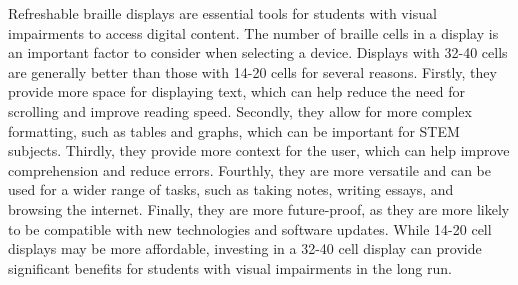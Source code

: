 \documentclass[14pt,letterpaper,twoside]{extreport}
\begin{document}
Refreshable braille displays are essential tools for students with visual impairments to access digital content. The number of braille cells in a display is an important factor to consider when selecting a device. Displays with 32-40 cells are generally better than those with 14-20 cells for several reasons. Firstly, they provide more space for displaying text, which can help reduce the need for scrolling and improve reading speed. Secondly, they allow for more complex formatting, such as tables and graphs, which can be important for STEM subjects. Thirdly, they provide more context for the user, which can help improve comprehension and reduce errors. Fourthly, they are more versatile and can be used for a wider range of tasks, such as taking notes, writing essays, and browsing the internet. Finally, they are more future-proof, as they are more likely to be compatible with new technologies and software updates. While 14-20 cell displays may be more affordable, investing in a 32-40 cell display can provide significant benefits for students with visual impairments in the long run.
\end{document}
